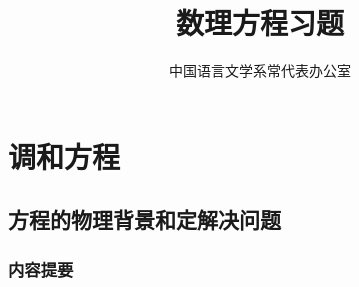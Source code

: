 \documentclass[12pt, a4paper]{article}
\title{数理方程习题}
\author{中国语言文学系常代表办公室}
\begin{document}
	\maketitle

	\newpage
	\tableofcontents
	\newpage
	\section{调和方程}
    \subsection{方程的物理背景和定解决问题}
    \subsubsection{内容提要}
    
\end{document}
